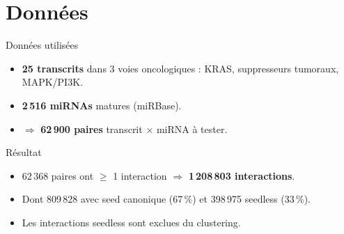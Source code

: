 \section{Données}

\begin{frame}{Données utilisées}
\begin{itemize}
	\item \textbf{25 transcrits} dans 3 voies oncologiques : KRAS, suppresseurs tumoraux, MAPK/PI3K.
	\item \textbf{2\,516 miRNAs} matures (miRBase).
	\item $\Rightarrow$ \textbf{62\,900 paires} transcrit $\times$ miRNA à tester.
\end{itemize}

\vspace{0.5em}
\begin{block}{Résultat}
	\begin{itemize}
		\item 62\,368 paires ont $\geq$ 1 interaction $\Rightarrow$ \textbf{1\,208\,803 interactions}.
		\item Dont 809\,828 avec seed canonique (67\,\%) et 398\,975 \alert{seedless} (33\,\%).
		\item Les interactions seedless sont exclues du clustering.
	\end{itemize}
\end{block}
\end{frame}
